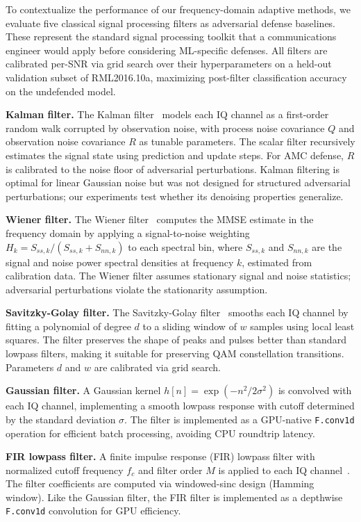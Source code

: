 To contextualize the performance of our frequency-domain adaptive methods,
we evaluate five classical signal processing filters as adversarial defense
baselines. These represent the standard signal processing toolkit that a
communications engineer would apply before considering ML-specific defenses.
All filters are calibrated per-SNR via grid search over their hyperparameters
on a held-out validation subset of RML2016.10a, maximizing post-filter
classification accuracy on the undefended model.

\textbf{Kalman filter.} The Kalman filter~\cite{kalman1960new} models each IQ
channel as a first-order random walk corrupted by observation noise, with
process noise covariance $Q$ and observation noise covariance $R$ as tunable
parameters. The scalar filter recursively estimates the signal state using
prediction and update steps. For AMC defense, $R$ is calibrated to the noise
floor of adversarial perturbations. Kalman filtering is optimal for linear
Gaussian noise but was not designed for structured adversarial perturbations;
our experiments test whether its denoising properties generalize.

\textbf{Wiener filter.} The Wiener filter~\cite{wiener1949extrapolation}
computes the MMSE estimate in the frequency domain by applying a
signal-to-noise weighting $H_k = S_{ss,k} / (S_{ss,k} + S_{nn,k})$ to each
spectral bin, where $S_{ss,k}$ and $S_{nn,k}$ are the signal and noise power
spectral densities at frequency $k$, estimated from calibration data.
The Wiener filter assumes stationary signal and noise statistics; adversarial
perturbations violate the stationarity assumption.

\textbf{Savitzky-Golay filter.} The Savitzky-Golay filter~\cite{savitzky1964smoothing}
smooths each IQ channel by fitting a polynomial of degree $d$ to a sliding
window of $w$ samples using local least squares. The filter preserves the
shape of peaks and pulses better than standard lowpass filters, making it
suitable for preserving QAM constellation transitions. Parameters $d$ and
$w$ are calibrated via grid search.

\textbf{Gaussian filter.} A Gaussian kernel $h[n] = \exp(-n^2 / 2\sigma^2)$
is convolved with each IQ channel, implementing a smooth lowpass response with
cutoff determined by the standard deviation $\sigma$. The filter is implemented
as a GPU-native \texttt{F.conv1d} operation for efficient batch processing,
avoiding CPU roundtrip latency.

\textbf{FIR lowpass filter.} A finite impulse response (FIR) lowpass filter
with normalized cutoff frequency $f_c$ and filter order $M$ is applied to
each IQ channel~\cite{proakis2006digital}. The filter coefficients are computed
via windowed-sinc design (Hamming window). Like the Gaussian filter, the FIR
filter is implemented as a depthwise \texttt{F.conv1d} convolution for GPU
efficiency.

